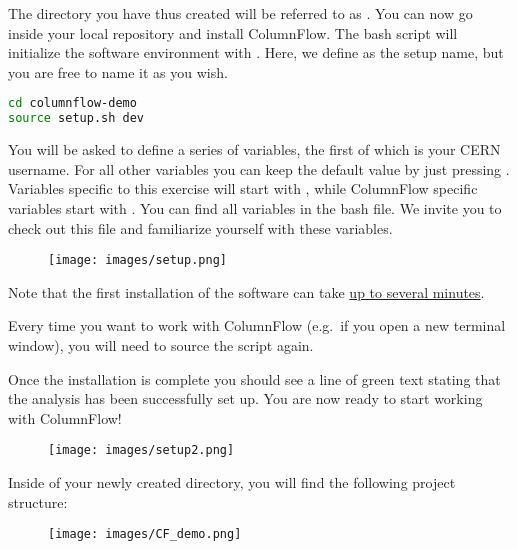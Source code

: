 The directory you have thus created will be referred to as . You can now go inside your local repository and install ColumnFlow. The  bash script will initialize the software environment with . Here, we define  as the setup name, but you are free to name it as you wish.

\begin{lstlisting}[language=bash]
cd columnflow-demo
source setup.sh dev
\end{lstlisting}

You will be asked to define a series of variables, the first of which is your CERN username. For all other variables you can keep the default value by just pressing . Variables specific to this exercise will start with , while ColumnFlow specific variables start with . You can find all variables in the  bash file. We invite you to check out this file and familiarize yourself with these variables.

\begin{figure}[!h]
    \centering
    \texttt{[image: images/setup.png]}
\end{figure}

Note that the first installation of the software can take \underline{up to several minutes}.

Every time you want to work with ColumnFlow (e.g.\ if you open a new terminal window), you will need to source the  script again.

Once the installation is complete you should see a line of green text stating that the analysis has been successfully set up. You are now ready to start working with ColumnFlow!

\begin{figure}[!h]
    \centering
    \texttt{[image: images/setup2.png]}
\end{figure}

Inside of your newly created  directory, you will find the following project structure:
\begin{figure}[!h]
    \centering
    \texttt{[image: images/CF\_demo.png]}
\end{figure}


